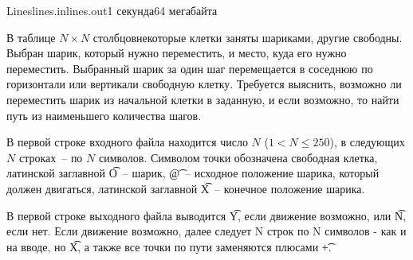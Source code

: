 \begin{problem}{Lines}{lines.in}{lines.out}{1 секунда}{64 мегабайта}

В таблице $N \times N$ столбцовнекоторые клетки заняты шариками, другие свободны. Выбран шарик, 
который нужно переместить, и место, куда его нужно переместить. Выбранный шарик за один шаг 
перемещается в соседнюю по горизонтали или вертикали свободную клетку. Требуется выяснить, 
возможно ли переместить шарик из начальной клетки в заданную, и если возможно, то найти путь 
из наименьшего количества шагов.

\InputFile

В первой строке входного файла находится число $N$ ($1 < N \le 250 $), в следующих $N$ строках~-- по $N$ символов. 
Символом точки обозначена свободная клетка, латинской заглавной \t{O}~-- шарик, \t{@}~-- исходное положение шарика, 
который должен двигаться, латинской заглавной \t{X}~-- конечное положение шарика.

\OutputFile

В первой строке выходного файла выводится \t{Y}, если движение возможно, или \t{N}, если нет. 
Если движение возможно, далее следует N строк по N символов - как и на вводе, но \t{X}, а также все точки по пути заменяются плюсами \t{+}.

\Example

\begin{example}
%
%
\end{example}

\end{problem}
